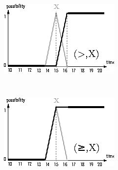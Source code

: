 \documentclass{llncs}
\begin{document}
\begin{figure}
\begin{subfigure}[b]{0.3\textwidth}
  \centering
  \includegraphics[width=\textwidth]{graphs/gt.eps}
\end{subfigure}
~
\begin{subfigure}[b]{0.3\textwidth}
  \centering
  \includegraphics[width=\textwidth]{graphs/gte.eps}
\end{subfigure}


\end{figure}
\end{document}
